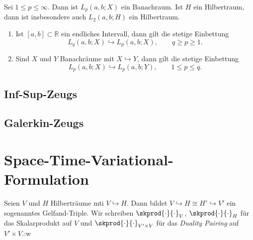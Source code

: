 \begin{Lemma}
    Sei $1 \leq p \leq \infty$. Dann ist $L_{p}(a, b; X)$ ein Banachraum.
    Ist $H$ ein Hilbertraum, dann ist insbesondere auch $L_{2}(a, b; H)$ ein Hilbertraum.
\end{Lemma}

\begin{Lemma}[Eigenschaften]
    \begin{enumerate}
        \item Ist $[a, b] \subset \mathbb{R}$ ein endliches Intervall, dann gilt die stetige Einbettung
        \begin{equation}
            L_{q}(a, b; X) \hookrightarrow L_{p}(a, b; X), \qquad q \geq p \geq 1.
        \end{equation}
        \item Sind $X$ und $Y$ Banachräume mit $X \hookrightarrow Y$, dann gilt die stetige Einbettung
        \begin{equation}
            L_{p}(a, b; X) \hookrightarrow L_{p}(a, b; Y), \qquad 1 \leq p \leq q.
        \end{equation}
    \end{enumerate}
\end{Lemma}



\subsection{Inf-Sup-Zeugs} %
\label{sub:inf_sup_zeugs}


\subsection{Galerkin-Zeugs} %
\label{sub:galerkin_zeugs}




\section{Space-Time-Variational-Formulation} %
\label{sec:space_time_variational_formulation}

Seien $V$ und $H$ Hilberträume mti $V \hookrightarrow H$.
Dann bildet $V \hookrightarrow H \cong H' \hookrightarrow V'$ ein sogenanntes
Gelfand-Triple.
Wir schreiben $\skprod{\cdot}{\cdot}_{V}$, $\skprod{\cdot}{\cdot}_{H}$ für das
Skalarprodukt auf $V$ und $\skprod{\cdot}{\cdot}_{V' \times V}$ für das
\emph{Duality Pairing} auf $V' \times V$.:w

